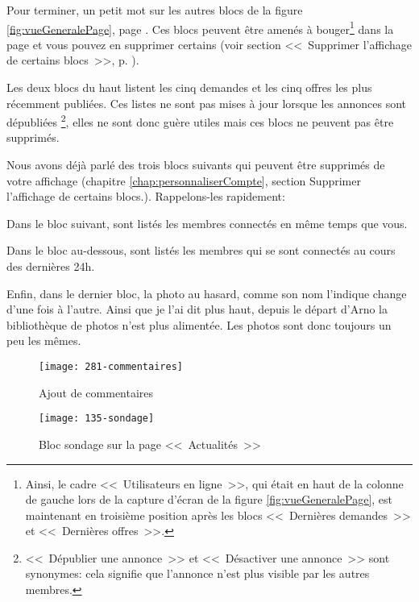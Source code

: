 Pour terminer, un petit mot sur les autres blocs de la figure \ref{fig:vueGeneralePage}, page \pageref{fig:vueGeneralePage}. Ces blocs peuvent être amenés à bouger\footnote{Ainsi, le cadre <<~Utilisateurs en ligne~>>, qui était en haut de la colonne de gauche lors de la capture d'écran de la figure \ref{fig:vueGeneralePage}, est maintenant en troisième position après les blocs <<~Dernières demandes~>> et <<~Dernières offres~>>.} dans la page et vous pouvez en supprimer certains (voir section <<~Supprimer l'affichage de certains blocs~>>, p. \pageref{sec:supprimerBlocs}).

 
Les deux blocs du haut listent les cinq demandes et les cinq offres les plus récemment publiées. Ces listes ne sont pas mises à jour lorsque les annonces sont dépubliées%
\footnote{<<~Dépublier une annonce~>> et <<~Désactiver une annonce~>> sont synonymes: cela signifie que l'annonce n'est plus visible par les autres membres.}, 
elles ne sont donc guère utiles mais ces blocs ne peuvent pas être supprimés.

Nous avons déjà parlé des trois blocs suivants qui peuvent être supprimés de votre affichage (chapitre \ref{chap:personnaliserCompte}, section \og{}Supprimer l'affichage de certains blocs\fg.). Rappelons-les rapidement:

Dans le bloc suivant, sont listés les membres connectés en même temps que vous.

Dans le bloc au-dessous, sont listés les membres qui se sont connectés au cours des dernières 24h.

Enfin, dans le dernier bloc, la photo au hasard, comme son nom l’indique change d’une fois à l’autre. Ainsi que je l’ai dit plus haut, depuis le départ d’Arno la bibliothèque de photos n’est plus alimentée. Les photos sont donc toujours un peu les mêmes.


\begin{figure}
    \centering
    \texttt{[image: 281-commentaires]}
    \caption{Ajout de commentaires}
    \label{fig:commentaires}
\end{figure}
\begin{figure}
    \centering
    \texttt{[image: 135-sondage]}
    \caption{Bloc sondage sur la page <<~Actualités~>>}
    \label{fig:sondage}
\end{figure}

